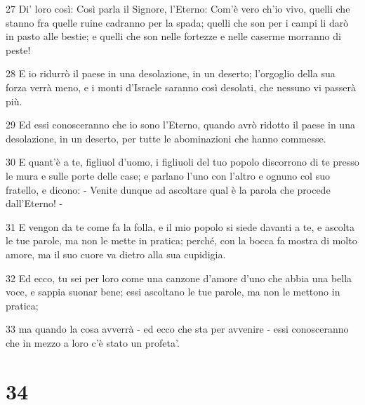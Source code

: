 \par 27 Di' loro così: Così parla il Signore, l'Eterno: Com'è vero ch'io vivo, quelli che stanno fra quelle ruine cadranno per la spada; quelli che son per i campi li darò in pasto alle bestie; e quelli che son nelle fortezze e nelle caserme morranno di peste!
\par 28 E io ridurrò il paese in una desolazione, in un deserto; l'orgoglio della sua forza verrà meno, e i monti d'Israele saranno così desolati, che nessuno vi passerà più.
\par 29 Ed essi conosceranno che io sono l'Eterno, quando avrò ridotto il paese in una desolazione, in un deserto, per tutte le abominazioni che hanno commesse.
\par 30 E quant'è a te, figliuol d'uomo, i figliuoli del tuo popolo discorrono di te presso le mura e sulle porte delle case; e parlano l'uno con l'altro e ognuno col suo fratello, e dicono: - Venite dunque ad ascoltare qual è la parola che procede dall'Eterno! -
\par 31 E vengon da te come fa la folla, e il mio popolo si siede davanti a te, e ascolta le tue parole, ma non le mette in pratica; perché, con la bocca fa mostra di molto amore, ma il suo cuore va dietro alla sua cupidigia.
\par 32 Ed ecco, tu sei per loro come una canzone d'amore d'uno che abbia una bella voce, e sappia suonar bene; essi ascoltano le tue parole, ma non le mettono in pratica;
\par 33 ma quando la cosa avverrà - ed ecco che sta per avvenire - essi conosceranno che in mezzo a loro c'è stato un profeta'.

\chapter{34}

